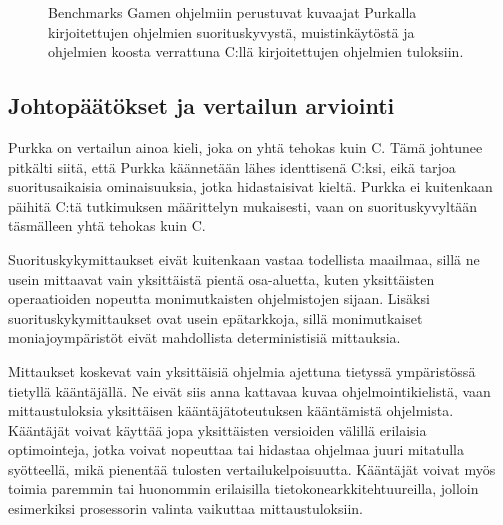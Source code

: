 \begin{figure}[ht!]
    \begin{adjustbox}{center}
        \begin{minipage}{1.25\textwidth}
        
        \end{minipage}
    \end{adjustbox}

    \begin{adjustbox}{center}
        \begin{minipage}{1.25\textwidth}
        
        \end{minipage}
    \end{adjustbox}

    \begin{adjustbox}{center}
        \begin{minipage}{1.25\textwidth}
        
        \end{minipage}
    \end{adjustbox}
    \caption{
        Benchmarks Gamen ohjelmiin perustuvat kuvaajat Purkalla kirjoitettujen ohjelmien
        suorituskyvystä, muistinkäytöstä ja ohjelmien koosta verrattuna C:llä
        kirjoitettujen ohjelmien tuloksiin.}
    \label{fig:purkkabenchmarksgame}
\end{figure}

\FloatBarrier

\subsection{Johtopäätökset ja vertailun arviointi}

Purkka on vertailun ainoa kieli, joka on yhtä tehokas kuin C. Tämä johtunee
pitkälti siitä, että Purkka käännetään lähes identtisenä C:ksi, eikä tarjoa
suoritusaikaisia ominaisuuksia, jotka hidastaisivat kieltä. Purkka ei kuitenkaan
päihitä C:tä tutkimuksen määrittelyn mukaisesti, vaan on suorituskyvyltään
täsmälleen yhtä tehokas kuin C.

Suorituskykymittaukset eivät kuitenkaan vastaa todellista maailmaa, sillä ne
usein mittaavat vain yksittäistä pientä osa-aluetta, kuten yksittäisten
operaatioiden nopeutta monimutkaisten ohjelmistojen sijaan. Lisäksi
suorituskykymittaukset ovat usein epätarkkoja, sillä monimutkaiset
moniajoympäristöt eivät mahdollista deterministisiä mittauksia.

Mittaukset koskevat vain yksittäisiä ohjelmia ajettuna tietyssä ympäristössä
tietyllä kääntäjällä. Ne eivät siis anna kattavaa kuvaa ohjelmointikielistä,
vaan mittaustuloksia yksittäisen kääntäjätoteutuksen kääntämistä ohjelmista.
Kääntäjät voivat käyttää jopa yksittäisten versioiden välillä erilaisia
optimointeja, jotka voivat nopeuttaa tai hidastaa ohjelmaa juuri mitatulla
syötteellä, mikä pienentää tulosten vertailukelpoisuutta. Kääntäjät voivat
myös toimia paremmin tai huonommin erilaisilla tietokonearkkitehtuureilla,
jolloin esimerkiksi prosessorin valinta vaikuttaa mittaustuloksiin.

